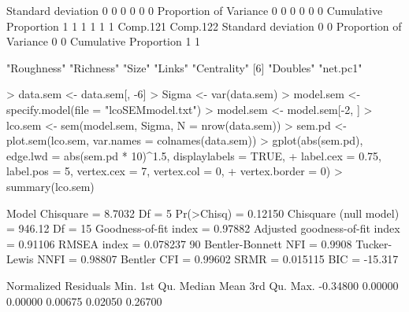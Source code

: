 \documentclass[12pt]{article}
\begin{document}
\begin{Schunk}
\begin{Soutput}
Standard deviation            0        0        0        0        0        0
Proportion of Variance        0        0        0        0        0        0
Cumulative Proportion         1        1        1        1        1        1
                       Comp.121 Comp.122
Standard deviation            0        0
Proportion of Variance        0        0
Cumulative Proportion         1        1
\end{Soutput}
\begin{Soutput}
[1] "Roughness"  "Richness"   "Size"       "Links"      "Centrality"
[6] "Doubles"    "net.pc1"   
\end{Soutput}
\begin{Sinput}
> data.sem <- data.sem[, -6]
> Sigma <- var(data.sem)
> model.sem <- specify.model(file = "lcoSEMmodel.txt")
> model.sem <- model.sem[-2, ]
> lco.sem <- sem(model.sem, Sigma, N = nrow(data.sem))
> sem.pd <- plot.sem(lco.sem, var.names = colnames(data.sem))
> gplot(abs(sem.pd), edge.lwd = abs(sem.pd * 10)^1.5, displaylabels = TRUE, 
+     label.cex = 0.75, label.pos = 5, vertex.cex = 7, vertex.col = 0, 
+     vertex.border = 0)
> summary(lco.sem)
\end{Sinput}
\begin{Soutput}
 Model Chisquare =  8.7032   Df =  5 Pr(>Chisq) = 0.12150
 Chisquare (null model) =  946.12   Df =  15
 Goodness-of-fit index =  0.97882
 Adjusted goodness-of-fit index =  0.91106
 RMSEA index =  0.078237   90% CI: (NA, 0.16288)
 Bentler-Bonnett NFI =  0.9908
 Tucker-Lewis NNFI =  0.98807
 Bentler CFI =  0.99602
 SRMR =  0.015115
 BIC =  -15.317 

 Normalized Residuals
    Min.  1st Qu.   Median     Mean  3rd Qu.     Max. 
-0.34800  0.00000  0.00000  0.00675  0.02050  0.26700 


\end{Soutput}
\end{Schunk}
\end{document}
